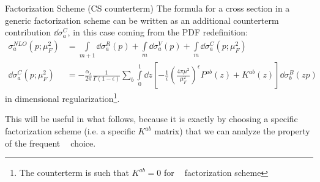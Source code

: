 \documentclass[8pt]{beamer}
\DeclareMathOperator{\msbar}{\overline{MS}}
\begin{document}
\begin{frame}{Factorization Scheme (CS counterterm)}
    The formula for a cross section in a generic factorization scheme can be
    written as an additional counterterm contribution $\dd\sigma^C_a$, in this
    case coming from the PDF redefinition:
    \begin{align*}
        \sigma_a^{NLO}(p; \mu_F^2) &= \int\limits_{m+1} \dd\sigma^R_a(p) +
        \int\limits_{m} \dd\sigma^V_a(p) + \int\limits_{m} \dd\sigma^C_a(p;
        \mu_F^2)\\
        \dd\sigma^C_a(p;\mu_F^2) &= - \frac{\alpha_s}{2\pi}
        \frac{1}{\Gamma(1-\epsilon)} \sum_b \int\limits_0^1 \dd z \left[ -
        \frac{1}{\epsilon} \left(\frac{4\pi\mu^2}{\mu_F^2}\right)^\epsilon
        P^{ab}(z) + K^{ab}(z) \right] \dd \sigma_b^B(zp)
    \end{align*}
    in dimensional regularization\footnote{The counterterm is such that
    $K^{ab}=0$ for $\msbar$ factorization scheme}.

    This will be useful in what follows, because it is exactly by choosing a
    specific factorization scheme (i.e. a specific $K^{ab}$ matrix) that we can
    analyze the property of the frequent $\msbar$ choice.
\end{frame}
\end{document}

